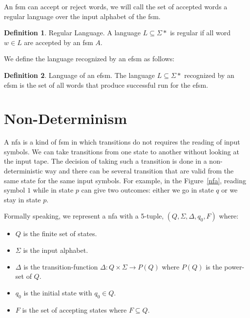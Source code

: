 \documentclass[12pt]{article}
\theoremstyle{definition}
\newtheorem{definition}{Definition}[section]
\theoremstyle{definition}
\theoremstyle{remark}
\begin{document}
An \gls{fsm} can accept or reject words, we will call the set of accepted words a regular language over the input alphabet of the \gls{fsm}.

\theoremstyle{definition}
\begin{definition}{Regular Language.} A language $L \subseteq \Sigma*$ is regular if all word $w \in L$ are accepted by an \gls{fsm} $A$.~\cite{Yu:1997:RL:267846.267848}
\end{definition}

We define the language recognized by an \gls{efsm} as follows:
\theoremstyle{definition}
\begin{definition}{Language of an \gls{efsm}.} The language $L \subseteq \Sigma*$ recognized by an \gls{efsm} is the set of all words that produce successful run for the \gls{efsm}.
\end{definition}



\section{Non-Determinism}


A \gls{nfa} is a kind of \gls{fsm} in which transitions do not requires the reading of input symbols. We can take transitions from one state to another without looking at the input tape. The decision of taking such a transition is done in a non-deterministic way and there can be several transition that are valid from the same state for the same input symbols. For example, in the Figure~\ref{nfa}, reading symbol $1$ while in state $p$ can give two outcomes: either we go in state $q$ or we stay in state $p$.~\cite{FA-DecisionProblems:1959}

Formally speaking, we represent a \gls{nfa} with a 5-tuple, $(Q, \Sigma, \Delta, q_0, F)$ where:

\begin{itemize}
\item $Q$ is the finite set of states.
\item $\Sigma$ is the input alphabet.
\item $\Delta$ is the transition-function $\Delta: Q \times \Sigma \rightarrow P(Q)$ where $P(Q)$ is the power-set of $Q$.
\item $q_0$ is the initial state with $q_0 \in Q$.
\item $F$ is the set of accepting states where $F \subseteq Q$.
\end{itemize}
\end{document}
